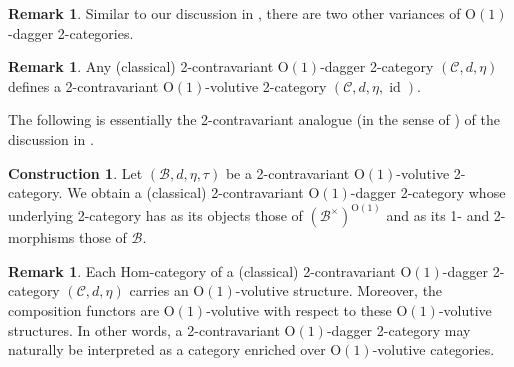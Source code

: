 \documentclass{article}
\newcommand{\id}{\operatorname{id}}%
\newcommand{\Oone}{\operatorname{O(1)}}
\newcommand{\B}{\mathcal{B}}
\newcommand{\C}{\mathcal{C}}
\numberwithin{equation}{section}
\theoremstyle{definition}
\newtheorem{construction}[definition]{Construction}
\newtheorem{remark}[definition]{Remark}
\theoremstyle{theorem}
\begin{document}
\begin{remark}
    Similar to our discussion in , there are two other variances of $\Oone$-dagger 2-categories.
\end{remark}
\begin{remark}
    Any (classical) 2-contravariant $\Oone$-dagger 2-category $(\C,d,\eta)$ defines a 2-contravariant $\Oone$-volutive 2-category $(\C,d,\eta,\id)$.
\end{remark}
The following is essentially the 2-contravariant analogue (in the sense of ) of the discussion in 
\cite[Section 2.3.3]{carqueville2025orbifoldshigherdaggerstructures}.
\begin{construction}\label{Construction: turning 2-contra Oone vol 2-cats dagger}
    Let $(\B,d,\eta,\tau)$ be a 2-contravariant $\Oone$-volutive 2-category. We obtain a (classical) 2-contravariant $\Oone$-dagger 2-category whose 
    underlying 2-category has as its objects those of $(\B^\times)^{\Oone}$ and as its 1- and 2-morphisms those of $\B$. 
\end{construction}
\begin{remark}\label{Remark: 2-contra dagger 2-cats and Oone volutive enrichments}
    Each Hom-category of a (classical) 2-contravariant $\Oone$-dagger 2-category $(\C,d,\eta)$ carries an $\Oone$-volutive structure. Moreover, the composition 
    functors are $\Oone$-volutive with respect to these $\Oone$-volutive structures. In other words, a 2-contravariant $\Oone$-dagger 2-category may naturally 
    be interpreted as a category enriched over $\Oone$-volutive categories. 
\end{remark}
\end{document}
